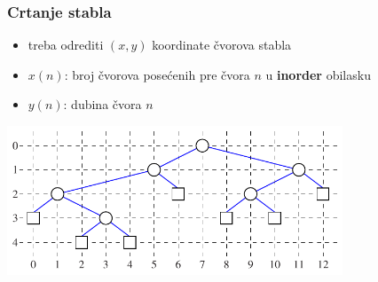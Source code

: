 \documentclass[compress,aspectratio=169]{beamer}
\begin{document}
\begin{frame}[fragile]
  \frametitle{Crtanje stabla}
  \begin{itemize}
    \item treba odrediti $(x,y)$ koordinate čvorova stabla
    \item $x(n)$: broj čvorova posećenih pre čvora $n$ u \textbf{inorder} obilasku
    \item $y(n)$: dubina čvora $n$
  \end{itemize}
  \begin{center}
    \includegraphics[width=10cm]{asp-08-pic18.pdf}
  \end{center}
\end{frame}
\end{document}
